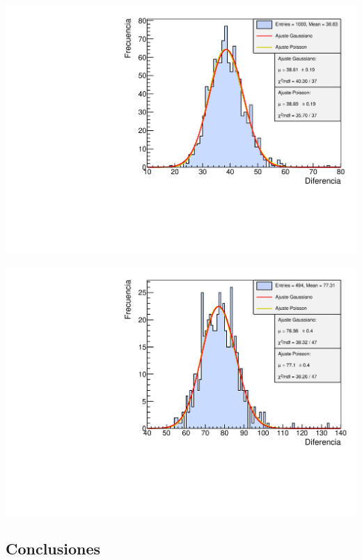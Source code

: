 \documentclass[11pt]{article}
\begin{document}
\begin{minipage}[t]{0.5\linewidth}
\begin{center}
		 \label{Fig:5s}
		\includegraphics[width=1\linewidth]{../Graficas/Histo_5s.pdf}
\end{center}
\end{minipage}	
\hfill
\begin{minipage}[t]{0.5\linewidth}
\begin{center}
		 \label{Fig:10s}
		\includegraphics[width=1\linewidth]{../Graficas/Histo_10s.pdf}
\end{center}
\end{minipage}	

\subsection{Conclusiones}
\end{document}
